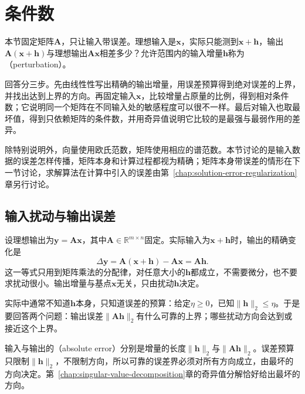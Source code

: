 
\section{条件数}
\label{sec:ls-perturbation}
\label{sec:linear-algebra-stability}
\label{sec:matrix-analysis-conditioning-perturbation}

本节固定矩阵$\bm A$，只让输入带误差。理想输入是$\bm x$，实际只能测到$\bm x+\bm h$，输出$\bm A(\bm x+\bm h)$与理想输出$\bm A\bm x$相差多少？允许范围内的输入增量$\bm h$称为（perturbation）。

回答分三步。先由线性性写出精确的输出增量，用误差预算得到绝对误差的上界，并找出达到上界的方向。再固定输入$\bm x$，比较增量占原量的比例，得到相对条件数；它说明同一个矩阵在不同输入处的敏感程度可以很不一样。最后对输入也取最坏值，得到只依赖矩阵的条件数，并用奇异值说明它比较的是最强与最弱作用的差异。

除特别说明外，向量使用欧氏范数，矩阵使用相应的谱范数。本节讨论的是输入数据的误差怎样传播，矩阵本身和计算过程都视为精确；矩阵本身带误差的情形在下一节讨论，求解算法在计算中引入的误差由第~\ref{chap:solution-error-regularization}章另行讨论。

\subsection{输入扰动与输出误差}
\label{sec:ls-input-error-scales}

设理想输出为$\bm y=\bm A\bm x$，其中$\bm A\in\mathbb R^{m\times n}$固定。实际输入为$\bm x+\bm h$时，输出的精确变化是
\[
 \Delta\bm y=\bm A(\bm x+\bm h)-\bm A\bm x=\bm A\bm h .
\]
这一等式只用到矩阵乘法的分配律，对任意大小的$\bm h$都成立，不需要微分，也不要求扰动很小。输出增量与基点$\bm x$无关，只由扰动$\bm h$决定。

实际中通常不知道$\bm h$本身，只知道误差的预算：给定$\eta\geq0$，已知$\lVert\bm h\rVert_2\leq\eta$。于是要回答两个问题：输出误差$\lVert\bm A\bm h\rVert_2$有什么可靠的上界；哪些扰动方向会达到或接近这个上界。

输入与输出的（absolute error）分别是增量的长度$\lVert\bm h\rVert_2$与$\lVert\bm A\bm h\rVert_2$。误差预算只限制$\lVert\bm h\rVert_2$，不限制方向，所以可靠的误差界必须对所有方向成立，由最坏的方向决定。第~\ref{chap:singular-value-decomposition}章的奇异值分解恰好给出最坏的方向。


